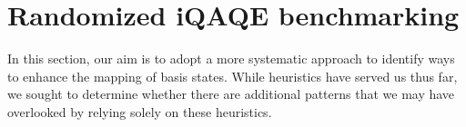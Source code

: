 




\section{Randomized iQAQE benchmarking}
\label{section:Randomized_iQAQE_benchmarking}

In this section, our aim is to adopt a more systematic approach to identify ways to enhance the mapping of basis states. While heuristics have served us thus far, we sought to determine whether there are additional patterns that we may have overlooked by relying solely on these heuristics.


\vspace{-2.5mm}
